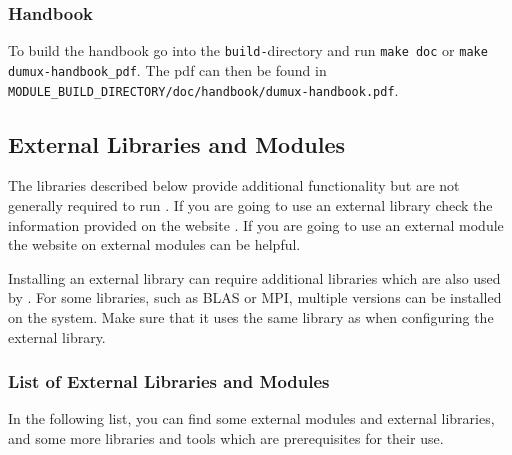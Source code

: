 \subsubsection{Handbook}
To build the \Dumux handbook go into the \texttt{build-}directory and
run \texttt{make doc} or \texttt{make dumux-handbook\_pdf}. The pdf can then be found
in \texttt{MODULE\_BUILD\_DIRECTORY/doc/handbook/dumux-handbook.pdf}.


\subsection{External Libraries and Modules} \label{sec:external-modules-libraries}
The libraries described below provide additional functionality but are not generally required to run \Dumux.
If you are going to use an external library check the information provided on the \Dune website \cite{DUNE-EXT-LIB}.
If you are going to use an external \Dune module the website on external modules \cite{DUNE-EXT-MOD} can be helpful.

Installing an external library can require additional libraries which are also used by \Dune.
For some libraries, such as BLAS or MPI, multiple versions can be installed on the system.
Make sure that it uses the same library as \Dune when configuring the external library.


\subsubsection{List of External Libraries and Modules}
In the following list, you can find some external modules and external libraries,
and some more libraries and tools which are prerequisites for their use.

